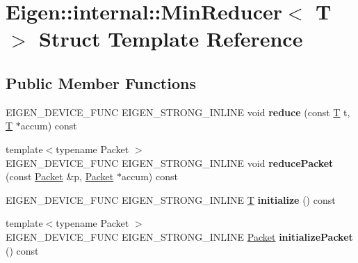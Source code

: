 \hypertarget{struct_eigen_1_1internal_1_1_min_reducer}{}\section{Eigen\+:\+:internal\+:\+:Min\+Reducer$<$ T $>$ Struct Template Reference}
\label{struct_eigen_1_1internal_1_1_min_reducer}
\subsection*{Public Member Functions}
\begin{DoxyCompactItemize}
\item 
\mbox{\label{struct_eigen_1_1internal_1_1_min_reducer_a02d0a492f0d751966fea69edb93c8095}} 
E\+I\+G\+E\+N\+\_\+\+D\+E\+V\+I\+C\+E\+\_\+\+F\+U\+NC E\+I\+G\+E\+N\+\_\+\+S\+T\+R\+O\+N\+G\+\_\+\+I\+N\+L\+I\+NE void {\bfseries reduce} (const \hyperlink{group___sparse_core___module}{T} t, \hyperlink{group___sparse_core___module}{T} $\ast$accum) const
\item 
\mbox{\label{struct_eigen_1_1internal_1_1_min_reducer_af45346bd0d9446c1b47316043c1cdc5f}} 
{\footnotesize template$<$typename Packet $>$ }\\E\+I\+G\+E\+N\+\_\+\+D\+E\+V\+I\+C\+E\+\_\+\+F\+U\+NC E\+I\+G\+E\+N\+\_\+\+S\+T\+R\+O\+N\+G\+\_\+\+I\+N\+L\+I\+NE void {\bfseries reduce\+Packet} (const \hyperlink{union_eigen_1_1internal_1_1_packet}{Packet} \&p, \hyperlink{union_eigen_1_1internal_1_1_packet}{Packet} $\ast$accum) const
\item 
\mbox{\label{struct_eigen_1_1internal_1_1_min_reducer_a5003cd8265762e5173317175fa165534}} 
E\+I\+G\+E\+N\+\_\+\+D\+E\+V\+I\+C\+E\+\_\+\+F\+U\+NC E\+I\+G\+E\+N\+\_\+\+S\+T\+R\+O\+N\+G\+\_\+\+I\+N\+L\+I\+NE \hyperlink{group___sparse_core___module}{T} {\bfseries initialize} () const
\item 
\mbox{\label{struct_eigen_1_1internal_1_1_min_reducer_ac305da0dc78faaae4c71bc99ebb9cdb8}} 
{\footnotesize template$<$typename Packet $>$ }\\E\+I\+G\+E\+N\+\_\+\+D\+E\+V\+I\+C\+E\+\_\+\+F\+U\+NC E\+I\+G\+E\+N\+\_\+\+S\+T\+R\+O\+N\+G\+\_\+\+I\+N\+L\+I\+NE \hyperlink{union_eigen_1_1internal_1_1_packet}{Packet} {\bfseries initialize\+Packet} () const

\end{DoxyCompactItemize}
